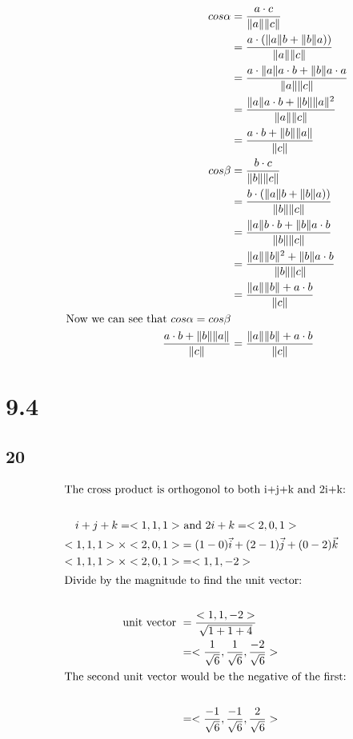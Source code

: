 \documentclass{article}%
\begin{document}
%
\begin{alignat*}{2}%
cos\alpha &= \frac{a \cdot c}{\|a\| \|c\|}\\%
&= \frac{a \cdot (\|a\|b+\|b\|a))}{\|a\| \|c\|}\\%
&= \frac{a \cdot \|a\|a \cdot b + \|b\|a \cdot a}{\|a\| \|c\|}\\%
&= \frac{\|a\|a \cdot b + \|b\| \|a\|^2}{\|a\| \|c\|}\\%
&= \frac{a \cdot b + \|b\| \|a\|}{\|c\|}\\%
cos\beta &= \frac{b \cdot c}{\|b\| \|c\|}\\%
&= \frac{b \cdot (\|a\|b+\|b\|a))}{\|b\| \|c\|}\\%
&= \frac{\|a\| b \cdot b + \|b\|a \cdot b}{\|b\| \|c\|}\\%
&= \frac{\|a\| \|b\|^2 + \|b\| a \cdot b}{\|b\| \|c\|}\\%
&= \frac{\|a\| \|b\| + a \cdot b}{\|c\|}\\%
\textnormal{Now we can see that } cos \alpha = cos \beta\\%
 \frac{a \cdot b + \|b\| \|a\|}{\|c\|} &= \frac{\|a\| \|b\| + a \cdot b}{\|c\|}\\%
\end{alignat*}

%
\section*{9.4}%
\subsection*{20}%
\begin{alignat*}{2}%
\intertext{The cross product is orthogonol to both i+j+k and 2i+k:}\\%
i+j+k = <1,1,1> & \textnormal{ and } 2i+k = <2,0,1>\\%
<1,1,1>\times <2,0,1> &= (1-0) \vec{i}+(2-1) \vec{j}+(0-2) \vec{k}\\%
<1,1,1>\times <2,0,1> &= <1,1,-2>\\%
\intertext{Divide by the magnitude to find the unit vector:}\\%
\textnormal{unit vector } &= \frac{<1,1,-2>}{\sqrt{1+1+4}}\\%
&= <\frac{1}{\sqrt{6}},\frac{1}{\sqrt{6}},\frac{-2}{\sqrt{6}}>\\%
\intertext{The second unit vector would be the negative of the first:}\\%
&= <\frac{-1}{\sqrt{6}},\frac{-1}{\sqrt{6}},\frac{2}{\sqrt{6}}>\\%
\end{alignat*}
\end{document}
